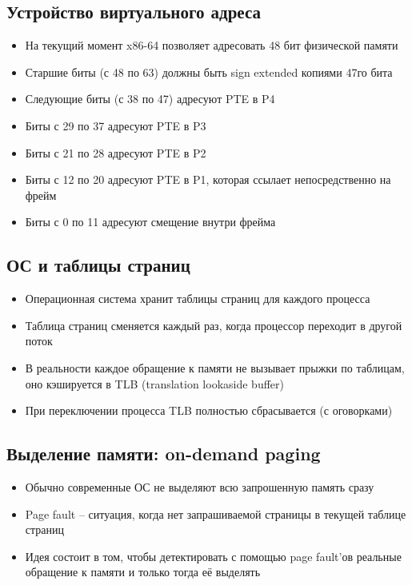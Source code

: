   \subsection{Устройство виртуального адреса}
    \begin{itemize}
      \item На текущий момент x86-64 позволяет адресовать 48 бит физической памяти
      \item Старшие биты (с 48 по 63) должны быть sign extended копиями 47го бита
      \item Следующие биты (с 38 по 47) адресуют PTE в P4
      \item Биты с 29 по 37 адресуют PTE в P3
      \item Биты с 21 по 28 адресуют PTE в P2
      \item Биты с 12 по 20 адресуют PTE в P1, которая ссылает непосредственно на фрейм
      \item Биты с 0 по 11 адресуют смещение внутри фрейма
    \end{itemize}
  
    \subsection{ОС и таблицы страниц}
      \begin{itemize}
        \item Операционная система хранит таблицы страниц для каждого процесса
        \item Таблица страниц сменяется каждый раз, когда процессор переходит в другой поток
        \item В реальности каждое обращение к памяти не вызывает прыжки по таблицам, оно кэшируется в TLB (translation lookaside buffer)
        \item При переключении процесса TLB полностью сбрасывается (с оговорками)
      \end{itemize}
    
    \subsection{Выделение памяти: on-demand paging}
      \begin{itemize}
        \item Обычно современные ОС не выделяют всю запрошенную память сразу
        \item Page fault -- ситуация, когда нет запрашиваемой страницы в текущей таблице страниц
        \item Идея состоит в том, чтобы детектировать с помощью page fault'ов реальные обращение к памяти и только тогда её выделять
      \end{itemize}
    
